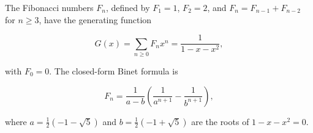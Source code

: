 The Fibonacci numbers $F_n$, defined by $F_1 = 1$, $F_2 = 2$, and $F_n = F_{n-1} + F_{n-2}$ for $n \geq 3$, have the generating function

$$G(x) = \sum_{n \geq 0} F_n x^n = \frac{1}{1 - x - x^2},$$

with $F_0 = 0$. The closed-form Binet formula is

$$F_n = \frac{1}{a - b} \left( \frac{1}{a^{n+1}} - \frac{1}{b^{n+1}} \right),$$

where $a = \frac{1}{2}(-1 - \sqrt{5})$ and $b = \frac{1}{2}(-1 + \sqrt{5})$ are the roots of $1 - x - x^2 = 0$.

